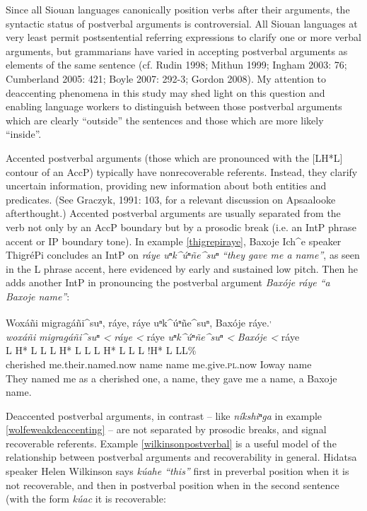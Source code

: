 \documentclass[output=paper]{LSP/langsci}
\begin{document}
Since all Siouan languages canonically position verbs after their arguments, the syntactic status of postverbal arguments is controversial. All Siouan languages at very least permit postsentential referring expressions to clarify one or more verbal arguments, but grammarians have varied in accepting postverbal arguments as elements of the same sentence (cf. Rudin 1998; Mithun 1999; Ingham 2003: 76; Cumberland 2005: 421; Boyle 2007: 292-3; Gordon 2008). My attention to deaccenting phenomena in this study may shed light on this question and enabling language workers to distinguish between those postverbal arguments which are clearly “outside” the sentences and those which are more likely “inside”.

Accented postverbal arguments (those which are pronounced with the [LH*L] contour of an AccP) typically have nonrecoverable referents. Instead, they clarify uncertain information, providing new information about both entities and predicates. (See Graczyk, 1991: 103, for a relevant discussion on Apsaalooke afterthought.) Accented postverbal arguments are usually separated from the verb not only by an AccP boundary but by a prosodic break (i.e. an IntP phrase accent or IP boundary tone). In example \ref{thigrepiraye}, Baxoje Ich\^{}e speaker ThigréPi concludes an IntP on \emph{ráye uⁿk\^{}úⁿñe\^{}suⁿ “they gave me a name”}, as seen in the L phrase accent, here evidenced by early and sustained low pitch. Then he adds another IntP in pronouncing the postverbal argument \emph{Baxóje ráye “a Baxoje name”}:

\ea\label{thigrepiraye}
Woxáñi migragáñi\^{}suⁿ, ráye, ráye uⁿk\^{}úⁿñe\^{}suⁿ, Baxóje ráye.\footnotemark\textsuperscript{,} \footnotemark\\
\glll	\emph{woxáñi} 	\emph{migragáñi\^{}suⁿ <}		\emph{ráye <}	ráye		\emph{uⁿk\^{}úⁿñe\^{}suⁿ <}	\emph{Baxóje <}		ráye\\
	{\ob L H* L}		{L\cb}	{\ob L H* L L\cb}	{\ob L H* L}	{L\cb}	{\ob L !H* L} 		{L\cb{}L\%}\\
	cherished	me.their.named.now	name		name	me.give.\textsc{pl}.now	Ioway			name\\
\glt	They named me as a cherished one, a name, they gave me a name, a Baxoje name.
\z

Deaccented postverbal arguments, in contrast -- like \emph{níkshiⁿga} in example \ref{wolfeweakdeaccenting} -- are not separated by prosodic breaks, and signal recoverable referents. Example \ref{wilkinsonpostverbal} is a useful model of the relationship between postverbal arguments and recoverability in general. Hidatsa speaker Helen Wilkinson says \emph{kúahe “this”} first in preverbal position when it is not recoverable, and then in postverbal position when in the second sentence (with the form \emph{kúac} it is recoverable:
\end{document}
